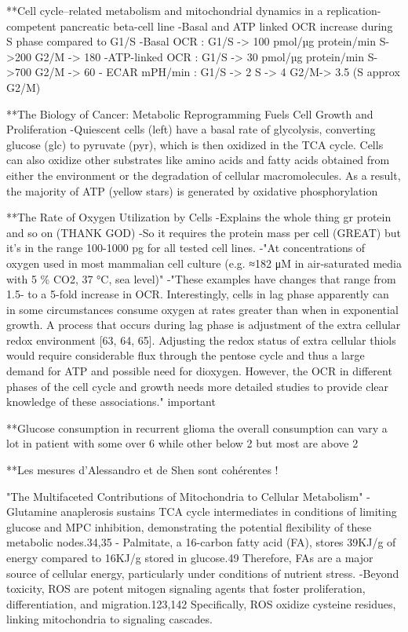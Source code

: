 \documentclass[11pt,a4paper]{article}
\begin{document}
**Cell cycle–related metabolism and mitochondrial dynamics in a replication-competent pancreatic beta-cell line
-Basal and ATP linked OCR increase during  S phase compared to G1/S
-Basal OCR : G1/S -> 100 pmol/µg protein/min S->200 G2/M -> 180 
-ATP-linked OCR : G1/S -> 30 pmol/µg protein/min S->700 G2/M -> 60
- ECAR mPH/min : G1/S -> 2 S -> 4 G2/M-> 3.5 (S approx G2/M) 

**The Biology of Cancer: Metabolic Reprogramming Fuels Cell Growth and Proliferation
-Quiescent cells (left) have a basal rate of glycolysis, converting glucose (glc) to pyruvate (pyr), which is then oxidized in the TCA cycle. Cells can also oxidize other
substrates like amino acids and fatty acids obtained from either the environment or the degradation of cellular macromolecules. As a result, the majority of ATP
(yellow stars) is generated by oxidative phosphorylation

**The Rate of Oxygen Utilization by Cells
-Explains the whole thing gr protein and so on (THANK GOD)
-So it requires the protein mass per cell (GREAT) but it's in the range 100-1000 pg for all tested cell lines.
-"At concentrations of oxygen used in most mammalian cell culture (e.g. ≈182 μM in air-saturated media with 5 \% CO2, 37 °C, sea level)"
-"These examples have changes that range from 1.5- to a 5-fold increase in OCR. Interestingly, cells in lag phase apparently can in some circumstances consume oxygen at rates greater than when in exponential growth. A process that occurs during lag phase is adjustment of the extra cellular redox environment [63, 64, 65]. Adjusting the redox status of extra cellular thiols would require considerable flux through the pentose cycle and thus a large demand for ATP and possible need for dioxygen. However, the OCR in different phases of the cell cycle and growth needs more detailed studies to provide clear knowledge of these associations." important

**Glucose consumption in recurrent glioma 
the overall consumption can vary a lot in patient with some over 6 while other below 2 but most are above 2

**Les mesures d'Alessandro et de Shen sont cohérentes !

"The Multifaceted Contributions of Mitochondria to Cellular Metabolism"
-  Glutamine anaplerosis sustains TCA cycle intermediates in conditions of limiting glucose and MPC inhibition, demonstrating the potential flexibility of these metabolic nodes.34,35
- Palmitate, a 16-carbon fatty acid (FA), stores 39KJ/g of energy compared to 16KJ/g stored in glucose.49 Therefore, FAs are a major source of cellular energy, particularly under conditions of nutrient stress. 
-Beyond toxicity, ROS are potent mitogen signaling agents that foster proliferation, differentiation, and migration.123,142 Specifically, ROS oxidize cysteine residues, linking mitochondria to signaling cascades. 
\end{document}
